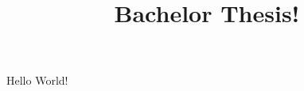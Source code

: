 \documentclass[12pt]{article}
\title{Bachelor Thesis!}
\date{}
\begin{document}
  \maketitle
  Hello World!
\end{document}
